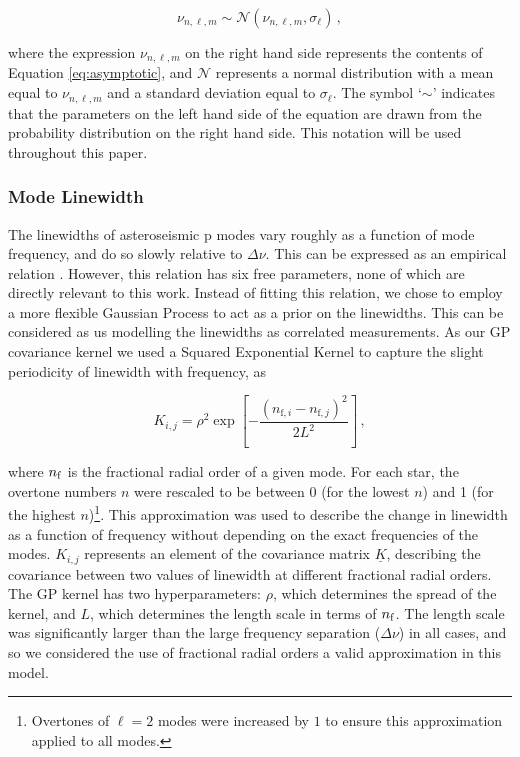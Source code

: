 \documentclass[12pt]{article}
\newcommand{\dnu}{\mbox{$\Delta \nu$}\xspace}
\begin{document}
\begin{equation}
	\nu_{n, \ell, m} \sim \mathcal{N}(\nu_{n, \ell, m}, \sigma_{\ell})\, ,
\end{equation}

\noindent where the expression $\nu_{n, \ell, m}$ on the right hand side represents the contents of Equation \ref{eq:asymptotic}, and $\mathcal{N}$ represents a normal distribution with a mean equal to $\nu_{n, \ell, m}$ and a standard deviation equal to $\sigma_{\ell}$. The symbol `$\sim$' indicates that the parameters on the left hand side of the equation are drawn from the probability distribution on the right hand side. This notation will be used throughout this paper.

\subsubsection{Mode Linewidth}
The linewidths of asteroseismic p modes vary roughly as a function of mode frequency, and do so slowly relative to \dnu. This can be expressed as an empirical relation \cite{davies+2014, appourchaux+2016, lund+2017}. However, this relation has six free parameters, none of which are directly relevant to this work. Instead of fitting this relation, we chose to employ a more flexible Gaussian Process \cite[GP]{rasmussen+williams2006} to act as a prior on the linewidths. This can be considered as us modelling the linewidths as correlated measurements. As our GP covariance kernel we used a Squared Exponential Kernel to capture the slight periodicity of linewidth with frequency, as

\begin{equation}\label{eq:gpkernel}
	K_{i,j} = \rho^2 \exp \left[ -\frac{(n_{\textrm{f}, i} - n_{\textrm{f}, j})^2}{2L^2} \right]\, ,
\end{equation}

\noindent where $n_{\rm f}$ is the fractional radial order of a given mode. For each star, the overtone numbers $n$ were rescaled to be between 0 (for the lowest $n$) and 1 (for the highest $n$)\footnote{Overtones of $\ell = 2$ modes were increased by $1$ to ensure this approximation applied to all modes.}. This approximation was used to describe the change in linewidth as a function of frequency without depending on the exact frequencies of the modes. $K_{i,j}$ represents an element of the covariance matrix $\underline{K}$, describing the covariance between two values of linewidth at different fractional radial orders. The GP kernel has two hyperparameters: $\rho$, which determines the spread of the kernel, and $L$, which determines the length scale in terms of $n_{\rm f}$. The length scale was significantly larger than the large frequency separation (\dnu) in all cases, and so we considered the use of fractional radial orders a valid approximation in this model.
\end{document}
